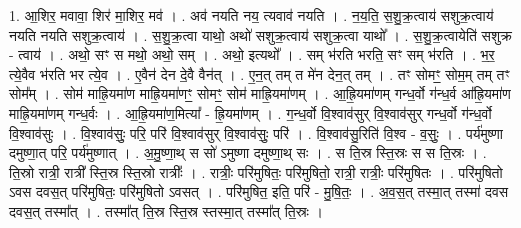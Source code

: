 \documentclass[17pt]{extarticle}
\begin{document}
1. आ॒शिर॒ मवावा॒ शिर॑ मा॒शिर॒ मव॑ । . अव॑ नयति नय॒ त्यवाव॑ नयति । . न॒य॒ति॒ स॒शु॒क्र॒त्वाय॑ सशुक्र॒त्वाय॑ नयति नयति सशुक्र॒त्वाय॑ । . स॒शु॒क्र॒त्वा याथो॒ अथो॑ सशुक्र॒त्वाय॑ सशुक्र॒त्वा याथो᳚ । . स॒शु॒क्र॒त्वायेति॑ सशुक्र - त्वाय॑ । . अथो॒ सꣳ स मथो॒ अथो॒ सम् । . अथो॒ इत्यथो᳚ । . सम् भ॑रति भरति॒ सꣳ सम् भ॑रति । . भ॒र॒ त्ये॒वैव भ॑रति भर त्ये॒व । . ए॒वैन॑ देन दे॒वै वैन॑त् । . ए॒न॒त् तम् त मे॑न देन॒त् तम् । . तꣳ सोमꣳ॒॒ सोम॒म् तम् तꣳ सोम᳚म् । . सोम॑ माह्रि॒यमा॑ण माह्रि॒यमा॑णꣳ॒॒ सोमꣳ॒॒ सोम॑ माह्रि॒यमा॑णम् । . आ॒ह्रि॒यमा॑णम् गन्ध॒र्वो ग॑न्ध॒र्व आ᳚ह्रि॒यमा॑ण माह्रि॒यमा॑णम् गन्ध॒र्वः । . आ॒ह्रि॒यमा॑ण॒मित्या᳚ - ह्रि॒यमा॑णम् । . ग॒न्ध॒र्वो वि॒श्वाव॑सुर् वि॒श्वाव॑सुर् गन्ध॒र्वो ग॑न्ध॒र्वो वि॒श्वाव॑सुः । . वि॒श्वाव॑सुः॒ परि॒ परि॑ वि॒श्वाव॑सुर् वि॒श्वाव॑सुः॒ परि॑ । . वि॒श्वाव॑सु॒रिति॑ वि॒श्व - व॒सुः॒ । . पर्य॑मुष्णा दमुष्णा॒त् परि॒ पर्य॑मुष्णात् । . अ॒मु॒ष्णा॒थ् स सो॑ ऽमुष्णा दमुष्णा॒थ् सः । . स ति॒स्र स्ति॒स्रः स स ति॒स्रः । . ति॒स्रो रात्री॒ रात्री᳚ स्ति॒स्र स्ति॒स्रो रात्रीः᳚ । . रात्रीः॒ परि॑मुषितः॒ परि॑मुषितो॒ रात्री॒ रात्रीः॒ परि॑मुषितः । . परि॑मुषितो ऽवस दवस॒त् परि॑मुषितः॒ परि॑मुषितो ऽवसत् । . परि॑मुषित॒ इति॒ परि॑ - मु॒षि॒तः॒ । . अ॒व॒स॒त् तस्मा॒त् तस्मा॑ दवस दवस॒त् तस्मा᳚त् । . तस्मा᳚त् ति॒स्र स्ति॒स्र स्तस्मा॒त् तस्मा᳚त् ति॒स्रः । \newline
\end{document}
